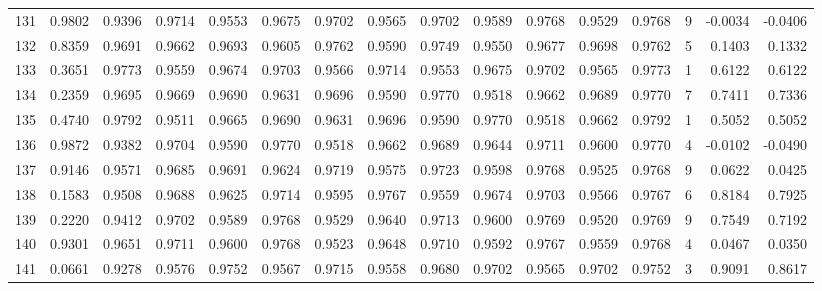 \begin{tabular}{lrrrrrrrrrrrrrrr}
131 &      0.9802 &  0.9396 &  0.9714 &  0.9553 &  0.9675 &  0.9702 &  0.9565 &  0.9702 &  0.9589 &  0.9768 &   0.9529 &     0.9768 &      9 &                   -0.0034 &                    -0.0406 \\
132 &      0.8359 &  0.9691 &  0.9662 &  0.9693 &  0.9605 &  0.9762 &  0.9590 &  0.9749 &  0.9550 &  0.9677 &   0.9698 &     0.9762 &      5 &                    0.1403 &                     0.1332 \\
133 &      0.3651 &  0.9773 &  0.9559 &  0.9674 &  0.9703 &  0.9566 &  0.9714 &  0.9553 &  0.9675 &  0.9702 &   0.9565 &     0.9773 &      1 &                    0.6122 &                     0.6122 \\
134 &      0.2359 &  0.9695 &  0.9669 &  0.9690 &  0.9631 &  0.9696 &  0.9590 &  0.9770 &  0.9518 &  0.9662 &   0.9689 &     0.9770 &      7 &                    0.7411 &                     0.7336 \\
135 &      0.4740 &  0.9792 &  0.9511 &  0.9665 &  0.9690 &  0.9631 &  0.9696 &  0.9590 &  0.9770 &  0.9518 &   0.9662 &     0.9792 &      1 &                    0.5052 &                     0.5052 \\
136 &      0.9872 &  0.9382 &  0.9704 &  0.9590 &  0.9770 &  0.9518 &  0.9662 &  0.9689 &  0.9644 &  0.9711 &   0.9600 &     0.9770 &      4 &                   -0.0102 &                    -0.0490 \\
137 &      0.9146 &  0.9571 &  0.9685 &  0.9691 &  0.9624 &  0.9719 &  0.9575 &  0.9723 &  0.9598 &  0.9768 &   0.9525 &     0.9768 &      9 &                    0.0622 &                     0.0425 \\
138 &      0.1583 &  0.9508 &  0.9688 &  0.9625 &  0.9714 &  0.9595 &  0.9767 &  0.9559 &  0.9674 &  0.9703 &   0.9566 &     0.9767 &      6 &                    0.8184 &                     0.7925 \\
139 &      0.2220 &  0.9412 &  0.9702 &  0.9589 &  0.9768 &  0.9529 &  0.9640 &  0.9713 &  0.9600 &  0.9769 &   0.9520 &     0.9769 &      9 &                    0.7549 &                     0.7192 \\
140 &      0.9301 &  0.9651 &  0.9711 &  0.9600 &  0.9768 &  0.9523 &  0.9648 &  0.9710 &  0.9592 &  0.9767 &   0.9559 &     0.9768 &      4 &                    0.0467 &                     0.0350 \\
141 &      0.0661 &  0.9278 &  0.9576 &  0.9752 &  0.9567 &  0.9715 &  0.9558 &  0.9680 &  0.9702 &  0.9565 &   0.9702 &     0.9752 &      3 &                    0.9091 &                     0.8617 \\

\end{tabular}
